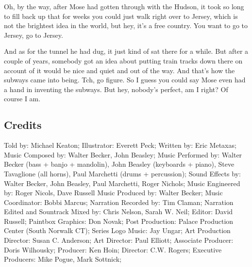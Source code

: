 Oh, by the way, after Mose had gotten through with the Hudson, it took so long to fill back up that for weeks you could just walk right over to Jersey, which is not the brightest idea in the world, but hey, it's a free country. You want to go to Jersey, go to Jersey.

And as for the tunnel he had dug, it just kind of sat there for a while. But after a couple of years, somebody got an idea about putting train tracks down there on account of it would be nice and quiet and out of the way. And that's how the subways came into being. Tch, go figure. So I guess you could say Mose even had a hand in inventing the subways. But hey, nobody's perfect, am I right? Of course I am.

\subsection{Credits}

Told by: Michael Keaton;
Illustrator: Everett Peck;
Written by: Eric Metaxas;
Music Composed by: Walter Becker, John Beasley;
Music Performed by: Walter Becker (bass + banjo + mandolin), John Beasley (keyboards + piano), Steve Tavaglione (all horns), Paul Marchetti (drums + percussion);
Sound Effects by: Walter Becker, John Beasley, Paul Marchetti, Roger Nichols;
Music Engineered by: Roger Nicols, Dave Russell
Music Produced by: Walter Becker;
Music Coordinator: Bobbi Marcus;
Narration Recorded by: Tim Claman;
Narration Edited and Sountrack Mixed by: Chris Nelson, Sarah W. Neil;
Editor: David Russell;
Paintbox Graphics: Don Novak;
Post Production: Palace Production Center (South Norwalk CT);
Series Logo Music: Jay Ungar;
Art Production Director: Susan C. Anderson;
Art Director: Paul Elliott;
Associate Producer: Doris Wilhousky;
Producer: Ken Hoin;
Director: C.W. Rogers;
Executive Producers: Mike Pogue, Mark Sottnick;